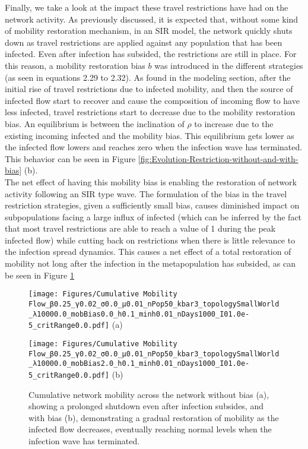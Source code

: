Finally, we take a look at the impact these travel restrictions have had on the network activity. As previously discussed, it is expected that, without some kind of mobility restoration mechanism, in an SIR model, the network quickly shuts down as travel restrictions are applied against any population that has been infected. Even after infection has subsided, the restrictions are still in place. For this reason, a mobility restoration bias $b$ was introduced in the different strategies (as seen in equations 2.29 to 2.32). As found in the modeling section, after the initial rise of travel restrictions due to infected mobility, and then the source of infected flow start to recover and cause the composition of incoming flow to have less infected, travel restrictions start to decrease due to the mobility restoration bias. An equilibrium is between the inclination of $\rho$ to increase due to the existing incoming infected and the mobility bias. This equilibrium gets lower as the infected flow lowers and reaches zero when the infection wave has terminated. This behavior can be seen in Figure \ref{fig:Evolution-Restriction-without-and-with-bias} (b).\\

The net effect of having this mobility bias is enabling the restoration of network activity following an SIR type wave. The formulation of the bias in the travel restriction strategies, given a sufficiently small bias, causes diminished impact on subpopulations facing a large influx of infected (which can be inferred by the fact that most travel restrictions are able to reach a value of 1 during the peak infected flow) while cutting back on restrictions when there is little relevance to the infection spread dynamics. This causes a net effect of a total restoration of mobility not long after the infection in the metapopulation has subsided, as can be seen in Figure \ref{fig:Mobility-flow-without-and-with-bias}

\begin{figure}[!ht]
	\centering
	\begin{minipage}[b]{0.45\textwidth}
		\texttt{[image: Figures/Cumulative Mobility Flow\_β0.25\_γ0.02\_σ0.0\_μ0.01\_nPop50\_kbar3\_topologySmallWorld\_λ10000.0\_mobBias0.0\_h0.1\_minh0.01\_nDays1000\_I01.0e-5\_critRange0.0.pdf]}
		\centering
		(a)
	\end{minipage}
	\hfill
	\begin{minipage}[b]{0.45\textwidth}
		\texttt{[image: Figures/Cumulative Mobility Flow\_β0.25\_γ0.02\_σ0.0\_μ0.01\_nPop50\_kbar3\_topologySmallWorld\_λ10000.0\_mobBias2.0\_h0.1\_minh0.01\_nDays1000\_I01.0e-5\_critRange0.0.pdf]}
		\centering
		(b)
	\end{minipage}
	\caption{\small Cumulative network mobility across the network without bias (a), showing a prolonged shutdown even after infection subsides, and with bias (b), demonstrating a gradual restoration of mobility as the infected flow decreases, eventually reaching normal levels when the infection wave has terminated.}	\label{fig:Mobility-flow-without-and-with-bias}
\end{figure}


